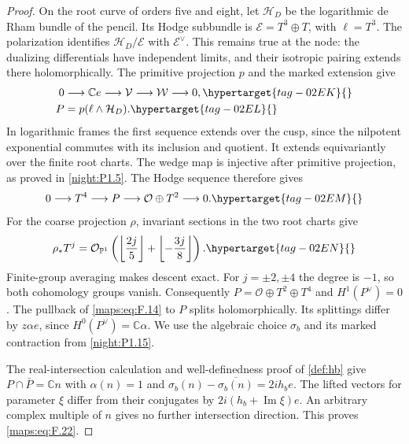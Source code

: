 \begin{proof}
On the root curve of orders five and eight, let $\mathcal H_D$ be
the logarithmic de Rham bundle of the pencil. Its Hodge subbundle is
$\mathcal E=T^3\oplus T$, with $\ell=T^3$. The polarization identifies
$\mathcal H_D/\mathcal E$ with $\mathcal E^\vee$. This remains true
at the node: the dualizing differentials have independent limits,
and their isotropic pairing extends there holomorphically.
The primitive projection $p$ and the marked extension give
\begin{align}
 0&\longrightarrow\mathbb C e\longrightarrow\mathcal V
   \longrightarrow\mathcal W\longrightarrow0,
 \hypertarget{tag-02EK}{}\label{maps:eq:F.14}\\
 P&=p(\ell\wedge\mathcal H_D).
 \hypertarget{tag-02EL}{}\label{maps:eq:F.15}
\end{align}
In logarithmic frames the first sequence extends over the cusp,
since the nilpotent exponential commutes with its inclusion and
quotient. It extends equivariantly over the finite root charts.
The wedge map is injective after primitive projection, as proved
in \cref{night:P1.5}. The Hodge sequence therefore gives
\begin{equation}
 0\longrightarrow T^4\longrightarrow P
   \longrightarrow\mathcal O\oplus T^2\longrightarrow0.
 \hypertarget{tag-02EM}{}\label{maps:eq:F.16}
\end{equation}
For the coarse projection $\rho$, invariant sections in the two
root charts give
\begin{equation}
 \rho_*T^j=\mathcal O_{\mathbb P^1}
 \left(\left\lfloor\frac{2j}{5}\right\rfloor+
       \left\lfloor-\frac{3j}{8}\right\rfloor\right).
 \hypertarget{tag-02EN}{}\label{maps:eq:F.17}
\end{equation}
Finite-group averaging makes descent exact. For $j=\pm2,\pm4$
the degree is $-1$, so both cohomology groups vanish. Consequently
$P=\mathcal O\oplus T^2\oplus T^4$ and
$H^1(P^\vee)=0$. The pullback of \eqref{maps:eq:F.14} to $P$
splits holomorphically. Its splittings differ by $z\alpha e$,
since $H^0(P^\vee)=\mathbb C\alpha$. We use the algebraic choice
$\sigma_b$ and its marked contraction from \cref{night:P1.15}.

The real-intersection calculation and well-definedness proof of
\cref{def:hb} give $P\cap\bar P=\mathbb Cn$ with
$\alpha(n)=1$ and
$\sigma_b(n)-\overline{\sigma_b(n)}=2ih_b e$.
The lifted vectors for parameter $\xi$ differ from their
conjugates by $2i(h_b+\operatorname{Im}\xi)e$.
An arbitrary complex multiple of $n$ gives no further
intersection direction. This proves \eqref{maps:eq:F.22}.


\end{proof}
